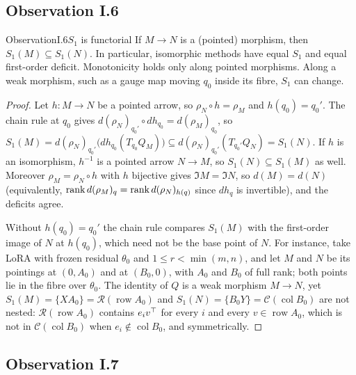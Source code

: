 \subsection{Observation I.6}\label{proof:I.6}

\begin{restate}{Observation}{I.6}{$S_1$ is functorial}
If $M\to N$ is a (pointed) morphism, then $S_1(M)\subseteq S_1(N)$. In particular, isomorphic methods have equal $S_1$ and
equal first-order deficit. Monotonicity holds only along pointed morphisms. Along a weak morphism, such as a gauge map
moving $q_0$ inside its fibre, $S_1$ can change.
\end{restate}

\begin{proof}
Let $h:M\to N$ be a pointed arrow, so $\rho_N\circ h=\rho_M$ and $h(q_0)=q_0'$. The chain rule at $q_0$ gives
$d(\rho_N)_{q_0'}\circ dh_{q_0}=d(\rho_M)_{q_0}$, so
$S_1(M)=d(\rho_N)_{q_0'}\big(dh_{q_0}(T_{q_0}Q_M)\big)\subseteq d(\rho_N)_{q_0'}(T_{q_0'}Q_N)=S_1(N)$. If $h$ is an
isomorphism, $h^{-1}$ is a pointed arrow $N\to M$, so $S_1(N)\subseteq S_1(M)$ as well. Moreover $\rho_M=\rho_N\circ h$
with $h$ bijective gives $\Im M=\Im N$, so $d(M)=d(N)$ (equivalently, $\operatorname{rank} d(\rho_M)_q=\operatorname{rank} d(\rho_N)_{h(q)}$ since $dh_q$ is
invertible), and the deficits agree.

Without $h(q_0)=q_0'$ the chain rule compares $S_1(M)$ with the first-order image of $N$ at $h(q_0)$, which need not be
the base point of $N$. For instance, take LoRA with frozen residual $\theta_0$ and $1\le r<\min(m,n)$, and let $M$ and
$N$ be its pointings at $(0,A_0)$ and at $(B_0,0)$, with $A_0$ and $B_0$ of full rank; both points lie in the fibre over
$\theta_0$. The identity of $Q$ is a weak morphism $M\to N$, yet $S_1(M)=\{XA_0\}=\mathcal R(\operatorname{row}A_0)$ and
$S_1(N)=\{B_0Y\}=\mathcal C(\operatorname{col}B_0)$ are not nested: $\mathcal R(\operatorname{row}A_0)$ contains $e_iv^{\top}$
for every $i$ and every $v\in\operatorname{row}A_0$, which is not in $\mathcal C(\operatorname{col}B_0)$ when
$e_i\notin\operatorname{col}B_0$, and symmetrically.
\end{proof}

\subsection{Observation I.7}\label{proof:I.7}

